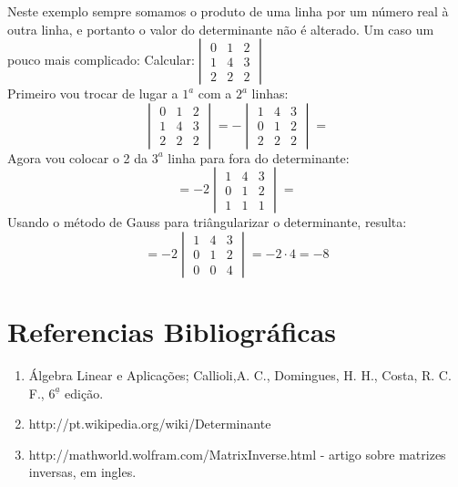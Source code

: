 Neste exemplo sempre somamos o produto de uma linha por um número real à outra linha, e portanto
o valor do determinante não é alterado. Um caso um pouco mais complicado:
Calcular:$ \begin{vmatrix} 0 & 1 & 2 \\ 1 & 4 & 3 \\ 2 & 2 & 2 \end{vmatrix}$\\
Primeiro vou trocar de lugar a $1^a$ com a $2^a$ linhas:
\[\begin{vmatrix} 0 & 1 & 2 \\ 1 & 4 & 3 \\ 2 & 2 & 2 \end{vmatrix} =- \begin{vmatrix}  1 & 4 & 3\\0 & 1 & 2  \\ 2 & 2 & 2 \end{vmatrix}=\]
Agora vou colocar o 2 da $3^a$ linha para fora do determinante:
\[=-2 \begin{vmatrix}  1 & 4 & 3\\0 & 1 & 2  \\ 1 & 1 & 1 \end{vmatrix}= \]
Usando o método de Gauss para triângularizar o determinante, resulta:
\[=-2 \begin{vmatrix}  1 & 4 & 3\\0 & 1 & 2  \\ 0 & 0 & 4 \end{vmatrix}= -2 \cdot 4 = -8\]

   \newpage
   
\section{Referencias Bibliográficas}
\begin{enumerate}
  \item Álgebra Linear e Aplicações; Callioli,A. C., Domingues, H. H., Costa, R. C. F., $6^{\underline{a}}$ edição.
  \item http://pt.wikipedia.org/wiki/Determinante
  \item http://mathworld.wolfram.com/MatrixInverse.html - artigo sobre matrizes inversas, em ingles.
\end{enumerate}
